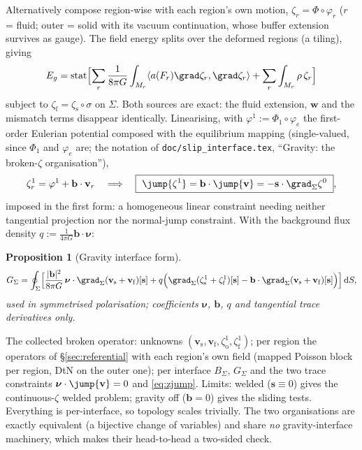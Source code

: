\documentclass[11pt]{article}
\numberwithin{equation}{section}
\newtheorem{proposition}{Proposition}[section]
\theoremstyle{remark}
\newcommand{\dS}{\,\mathrm{d}S}
\newcommand{\vv}{\mathbf{v}}
\newcommand{\vw}{\mathbf{w}}
\newcommand{\vs}{\mathbf{s}}
\newcommand{\vb}{\mathbf{b}}
\newcommand{\bnu}{\bm{\nu}}
\newcommand{\code}[1]{\texttt{#1}}
\begin{document}
Alternatively compose region-wise with each region's own motion, $\zeta_r
= \Phi\circ\varphi_r$ ($r$ = fluid; outer = solid with its vacuum
continuation, whose buffer extension survives as gauge). The field energy
splits over the deformed regions (a tiling), giving
\begin{equation}
  E_g = \operatorname{stat}\Bigl[\sum_r\frac{1}{8\pi G}\int_{M_r}
    \langle a(F_r)\grad\zeta_r,\grad\zeta_r\rangle
    + \sum_r\int_{M_r}\rho\,\zeta_r\Bigr]
\end{equation}
subject to $\zeta_{\mathrm{f}} = \zeta_{\mathrm{s}}\circ\sigma$ on
$\Sigma$. Both sources are exact: the fluid extension, $\vw$ and the
mismatch terms disappear identically. Linearising, with
$\varphi^1 := \Phi_1\circ\varphi_e$ the first-order Eulerian potential
composed with the equilibrium mapping (single-valued, since $\Phi_1$
and $\varphi_e$ are; the notation of \code{doc/slip\_interface.tex},
``Gravity: the broken-$\zeta$ organisation''),
\begin{equation}
  \zeta^1_r = \varphi^1 + \vb\cdot\vv_r \quad\Longrightarrow\quad
  \boxed{\ \jump{\zeta^1} = \vb\cdot\jump{\vv} = -\vs\cdot\grad_\Sigma\zeta^0\ },
  \label{eq:zjump}
\end{equation}
imposed in the first form: a homogeneous linear constraint needing neither
tangential projection nor the normal-jump constraint. With the background
flux density $q := \frac{1}{4\pi G}\vb\cdot\bnu$:
\begin{proposition}[Gravity interface form]
\begin{equation}
  G_\Sigma = \oint_\Sigma\Bigl[\frac{|\vb|^2}{8\pi G}\,\bnu\cdot
     \grad_\Sigma(\vv_{\mathrm{s}}+\vv_{\mathrm{f}})[\vs]
   + q\Bigl(\grad_\Sigma(\zeta^1_{\mathrm{s}}+\zeta^1_{\mathrm{f}})[\vs]
     - \vb\cdot\grad_\Sigma(\vv_{\mathrm{s}}+\vv_{\mathrm{f}})[\vs]\Bigr)
   \Bigr]\dS,
\end{equation}
used in symmetrised polarisation; coefficients $\bnu$, $\vb$, $q$ and
tangential trace derivatives only.
\end{proposition}
The collected broken operator: unknowns $(\vv_{\mathrm{s}},\vv_{\mathrm{f}},
\zeta^1_{\mathrm{o}},\zeta^1_{\mathrm{f}})$; per region the operators of
\S\ref{sec:referential} with each region's own field (mapped Poisson block
per region, DtN on the outer one); per interface $B_\Sigma$, $G_\Sigma$ and
the two trace constraints $\bnu\cdot\jump{\vv} = 0$ and \eqref{eq:zjump}.
Limits: welded ($\vs\equiv0$) gives the continuous-$\zeta$ welded problem;
gravity off ($\vb = 0$) gives the sliding tests. Everything is
per-interface, so topology scales trivially. The two organisations are
exactly equivalent (a bijective change of variables) and share \emph{no}
gravity-interface machinery, which makes their head-to-head a two-sided
check.
\end{document}
